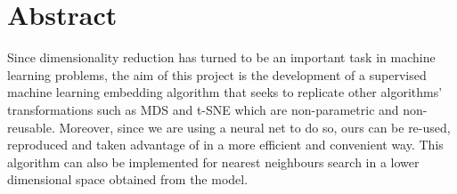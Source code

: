 \documentclass[a4paper,11pt,spanish]{report}
\begin{document}
\raggedbottom







\chapter*{Abstract}
\setcounter{page}{3}

Since dimensionality reduction has turned to be an important task in machine learning problems, the aim of this project is the development of a supervised machine learning embedding algorithm that seeks to replicate other algorithms' transformations such as MDS and t-SNE which are non-parametric and non-reusable. Moreover, since we are using a neural net to do so, ours can be re-used, reproduced and taken advantage of in a more efficient and convenient way. This algorithm can also be implemented for nearest neighbours search in a lower dimensional space obtained from the model.
\end{document}
